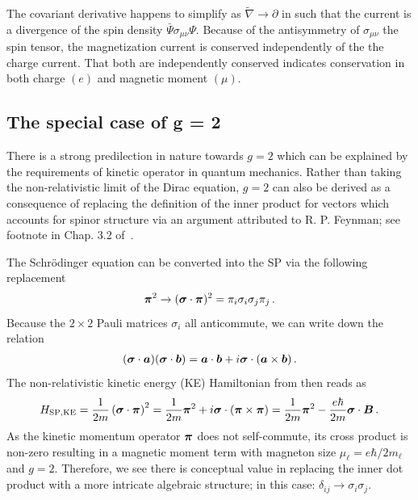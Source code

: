 The covariant derivative happens to simplify as $\widetilde\nabla\rightarrow\partial$ in  such that the current is a divergence of the spin density $\bar\Psi\sigma_{\mu\nu}\Psi$. Because of the antisymmetry of $\sigma_{\mu\nu}$ the spin tensor, the magnetization current is conserved independently of the the charge current. That both are independently conserved indicates conservation in both charge $(e)$ and magnetic moment $(\mu)$.

\subsection{The special case of g = 2}
\label{sec:unique}
There is a strong predilection in nature towards $g\!=\!2$ which can be explained by the requirements of kinetic operator in quantum mechanics. Rather than taking the non-relativistic limit of the Dirac equation, $g\!=\!2$ can also be derived as a consequence of replacing the definition of the inner product for vectors which accounts for spinor structure via an argument attributed to R. P. Feynman; see footnote in Chap. 3.2 of~\cite{sakurai1967advanced}.

The Schr{\"o}dinger equation can be converted into the SP  via the following replacement
\begin{alignat}{1}
	\label{nat:0}
    \boldsymbol{\pi}^{2}\rightarrow(\boldsymbol{\sigma}\cdot\boldsymbol{\pi})^{2}=\pi_{i}\sigma_{i}\sigma_{j}\pi_{j}\,.
\end{alignat}
Because the $2\times2$ Pauli matrices $\sigma_{i}$ all anticommute, we can write down the relation
\begin{alignat}{1}
	\label{nat:1}
    (\boldsymbol{\sigma}\cdot\boldsymbol{a})(\boldsymbol{\sigma}\cdot\boldsymbol{b})=\boldsymbol{a}\cdot\boldsymbol{b}+i\boldsymbol{\sigma}\cdot(\boldsymbol{a}\times\boldsymbol{b})\,.
\end{alignat}
The non-relativistic kinetic energy (KE) Hamiltonian from  then reads as
\begin{align}
	\label{nat:2}
    {H}_{\mathrm{SP,KE}}=\frac{1}{2m}\left(\boldsymbol{\sigma}\cdot\boldsymbol{\pi}\right)^{2}=\frac{1}{2m}\boldsymbol{\pi}^{2}+i\boldsymbol{\sigma}\cdot(\boldsymbol{\pi}\times\boldsymbol{\pi})=\frac{1}{2m}\boldsymbol{\pi}^{2}-\frac{e\hbar}{2m}\boldsymbol{\sigma}\cdot\boldsymbol{B}\,.
\end{align}
As the kinetic momentum operator $\boldsymbol{\pi}$ does not self-commute, its cross product is non-zero resulting in a magnetic moment term with magneton size $\mu_{\ell}=e\hbar/2m_{\ell}$ and $g\!=\!2$. Therefore, we see there is conceptual value in replacing the inner dot product with a more intricate algebraic structure; in this case: $\delta_{ij}\rightarrow\sigma_{i}\sigma_{j}$.

